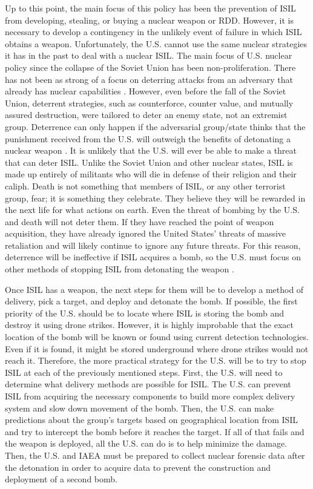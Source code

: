 \documentclass{report}
\begin{document}
Up to this point, the main focus of this policy has been the prevention of ISIL from developing, stealing, or buying a nuclear weapon or RDD.  However, it is necessary to develop a contingency in the unlikely event of failure in which ISIL obtains a weapon.  Unfortunately, the U.S. cannot use the same nuclear strategies it has in the past to deal with a nuclear ISIL.  The main focus of U.S. nuclear policy since the collapse of the Soviet Union has been non-proliferation.  There has not been as strong of a focus on deterring attacks from an adversary that already has nuclear capabilities \cite{Bracken2013}. However, even before the fall of the Soviet Union, deterrent strategies, such as counterforce, counter value, and mutually assured destruction, were tailored to deter an enemy state, not an extremist group.  Deterrence can only happen if the adversarial group/state thinks that the punishment received from the U.S. will outweigh the benefits of detonating a nuclear weapon \cite{kaplan1991wizards}.  It is unlikely that the U.S. will ever be able to make a threat that can deter ISIL.  Unlike the Soviet Union and other nuclear states, ISIL is made up entirely of militants who will die in defense of their religion and their caliph.  Death is not something that members of ISIL, or any other terrorist group, fear; it is something they celebrate.  They believe they will be rewarded in the next life for what actions on earth.  Even the threat of bombing by the U.S. and death will not deter them.  If they have reached the point of weapon acquisition, they have already ignored the United States' threats of massive retaliation and will likely continue to ignore any future threats.  For this reason, deterrence will be ineffective if ISIL acquires a bomb, so the U.S. must focus on other methods of stopping ISIL from detonating the weapon \cite{Sanderson2015}.

Once ISIL has a weapon, the next steps for them will be to develop a method of delivery, pick a target, and deploy and detonate the bomb.  If possible, the first priority of the U.S. should be to locate where ISIL is storing the bomb and destroy it using drone strikes.  However, it is highly improbable that the exact location of the bomb will be known or found using current detection technologies.  Even if it is found, it might be stored underground where drone strikes would not reach it.  Therefore, the more practical strategy for the U.S. will be to try to stop ISIL at each of the previously mentioned steps.   First, the U.S. will need to determine what delivery methods are possible for ISIL.  The U.S. can prevent ISIL from acquiring the necessary components to build more complex delivery system and slow down movement of the bomb.  Then, the U.S. can make predictions about the group's targets based on geographical location from ISIL and try to intercept the bomb before it reaches the target.  If all of that fails and the weapon is deployed, all the U.S. can do is to help minimize the damage.  Then, the U.S. and IAEA must be prepared to collect nuclear forensic data after the detonation in order to acquire data to prevent the construction and deployment of a second bomb.
\end{document}

